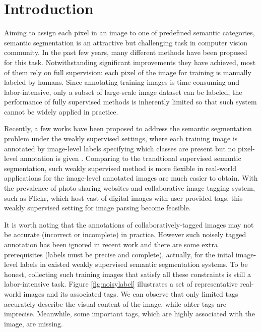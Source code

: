 \section{Introduction}
Aiming to assign each pixel in an image to one of predefined semantic categories, semantic segmentation is an attractive but challenging task in computer vision community. In the past few years, many different methods \cite{csurka2011efficient,gonfaus2010harmony,ladicky2009associative,nowozin2010parameter,shotton2008semantic,shotton2006textonboost,singh2013nonparametric,verbeek2007scene,yang2007multiple,yao2012describing} have been proposed for this task. Notwithstanding significant improvements they have achieved, most of them rely on full supervision: each pixel of the image for training is manually labeled by humans. Since annotating training images is time-consuming and labor-intensive, only a subset of large-scale image dataset can be labeled, the performance of fully supervised methods is inherently limited so that such system cannot be widely applied in practice.

Recently, a few works have been proposed to address the semantic segmentation problem under the weakly supervised settings, where each training image is annotated by image-level labels specifying which classes are present but no pixel-level annotation is given \cite{verbeek2007region,vezhnevets2010towards,vezhnevets2011weakly,vezhnevets2012weakly,xu2014tell,zhang2013sparse,zhang2013probabilistic}. Comparing to the trandtional supervised semantic segmentation, such weakly supervised method is more flexible in real-world applications for the image-level annotated images are much easier to obtain. With the prevalence of photo sharing websites and collaborative image tagging system, such as Flickr, which host vast of digital images with user provided tags, this weakly supervised setting for image parsing become feasible.

It is worth noting that the annotations of collaboratively-tagged images may not be accurate (incorrect or incomplete) in practice. However such noisely tagged annotation has been ignored in recent work and  there are some extra prerequisites (\eg labels must be precise and complete), actually, for the inital image-level labels in existed weakly supervised semantic segmentation systems. To be honest, collecting such training images that satisfy all these constraints is still a labor-intensive task. Figure \ref{fig:noisylabel} illustrates a set of representative real-world images and its associated tags. We can observe that only limited tags accurately describe the visual content of the image, while ohter tags are imprecise. Meanwhile, some important tags, which are highly associated with the image, are missing.

